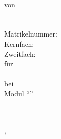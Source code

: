 

\ifx\event\undefined
\else
	\date[\mydate]{\today}
\fi

\expandafter\def\expandafter\quote\expandafter{\quote\onehalfspacing}

\doublespacing
\parindent 0pt
\parskip 12pt




\thispagestyle{empty}
\begin{titlepage}
\singlespacing
\begin{center}


\quad\\[5cm]



{%
    \normalfont\bfseries\Large\onehalfspacing
    \titel \par}
    \vskip 3.5cm

von \\[0.3cm]

\autor \\
\email \\
Matrikelnummer: \matrikelnummer \\
Kernfach:  \\
Zweitfach: \zweitfach \\[2cm]

für \\[0.3cm]

\veranstaltung \\
bei \dozentin \\
Modul "`\modul"' \\
\institut \\
\universitaet \\
\semester

\vfill

\ort, \datum


\end{center}
\end{titlepage}

\restoregeometry


\setcounter{page}{1}
